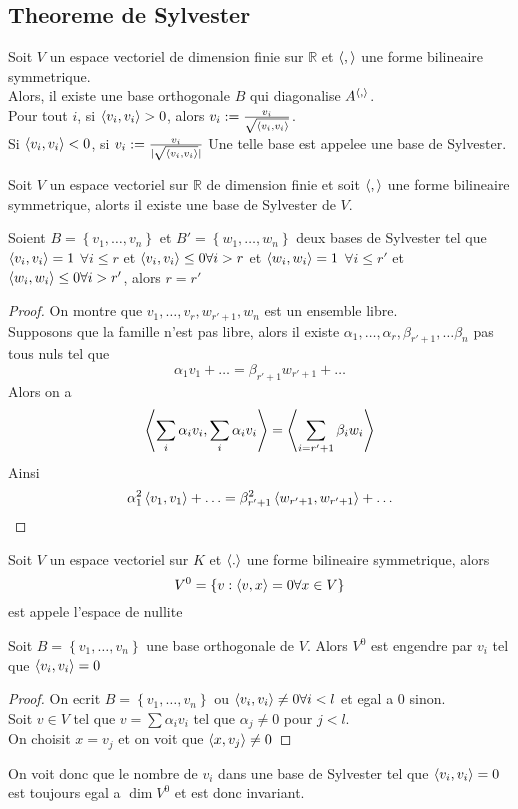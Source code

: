 \documentclass[../main.tex]{subfiles}
\begin{document}
\subsection{Theoreme de Sylvester}
Soit $V$ un espace vectoriel de dimension finie sur $\mathbb{R}$ et $\left\langle,\right\rangle $ une forme bilineaire symmetrique.\\
Alors, il existe une base orthogonale $B$ qui diagonalise $A^{\left\langle,\right\rangle}$.\\
Pour tout $i$, si $\left\langle v_i,v_i\right\rangle >0$, alors $v_i := \frac{v_i}{\sqrt{\left\langle v_i,v_i\right\rangle} }$.\\
	Si $\left\langle v_i,v_i\right\rangle <0$, si $v_i:= \frac{v_i}{|\sqrt{\left\langle v_i,v_i\right\rangle }| }$
	Une telle base est appelee une base de Sylvester.
\begin{propo}
	Soit $V$ un espace vectoriel sur $\mathbb{R}$ de dimension finie et soit $\left\langle,\right\rangle$ une forme bilineaire symmetrique, alorts il existe une base de Sylvester de $V$.
\end{propo}
\begin{thm}
	Soient $ B=\left\{ v_1, \ldots, v_n \right\} $ et $B'= \left\{ w_1, \ldots, w_n \right\} $ deux bases de Sylvester tel que $\left\langle v_i,v_i\right\rangle=1 $ $\forall i\leq r$ et $\left\langle v_i,v_i\right\rangle \leq 0 \forall i>r$ et  $\left\langle w_i,w_i\right\rangle=1 $ $\forall i\leq r'$ et $\left\langle w_i,w_i\right\rangle \leq 0 \forall i>r'$, alors $r=r'$
\end{thm}
\begin{proof}
	On montre que $v_1, \ldots, v_r, w_{r'+1} , w_n$ est un ensemble libre.\\
Supposons que la famille n'est pas libre, alors il existe $\alpha_1, \ldots, \alpha_r, \beta_{r'+1} , \ldots \beta_n$ pas tous nuls tel que
\[ 
\alpha_1 v_1 + \ldots = \beta_{r'+1} w_{r'+1} + \ldots
\]
Alors on a
\[ 
	\left\langle \sum_{i}\alpha_i v_i, \sum_{i}\alpha_i v_i\right\rangle = \left\langle \sum_{i=r'+1} \beta_i w_i \right\rangle 
\]
Ainsi
\[ 
\alpha_1^{2} \left\langle v_1, v_1\right\rangle  + \ldots = \beta_{r'+1}^{2} \left\langle w_{r'+1},w_{r'+1}  \right\rangle  + \ldots
\]




\end{proof}
\begin{defn}
	Soit $V$ un espace vectoriel sur $K$ et $\left\langle.\right\rangle$ une forme bilineaire symmetrique, alors
	\[ 
	V^{0}= \left\{ v: \left\langle v,x\right\rangle =0 \forall x \in V \right\} 
	\]
	est appele l'espace de nullite
\end{defn}
\begin{lemma}
	Soit $B = \left\{ v_1, \ldots, v_n \right\} $ une base orthogonale de $V$. Alors $V^{0}$ est engendre par $v_i$ tel que $\left\langle v_i, v_i \right\rangle = 0$
\end{lemma}
\begin{proof}
On ecrit $B= \left\{ v_1, \ldots, v_n \right\} $ ou $\left\langle v_i,v_i\right\rangle \neq0 \forall i<l$ et  egal a $0$ sinon.\\
Soit $v \in V$ tel que $v= \sum \alpha_i v_i$ tel que $\alpha_j \neq 0 $ pour $j<l$.\\
On choisit $x= v_j$ et on voit que $\left\langle x,v_j \right\rangle\neq 0$
\end{proof}
On voit donc que le nombre de $v_i$ dans une base de Sylvester tel que $\left\langle v_i,v_i\right\rangle =0$ est toujours egal a $\dim V^{0}$ et est donc invariant.
\end{document}
